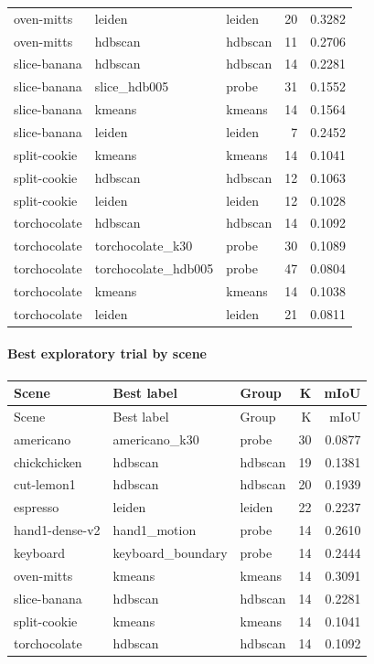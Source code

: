 \documentclass[10pt]{article}
\begin{document}
\begin{longtable}{lllrr}
oven-mitts & leiden & leiden & 20 & 0.3282 \\
oven-mitts & hdbscan & hdbscan & 11 & 0.2706 \\
slice-banana & hdbscan & hdbscan & 14 & 0.2281 \\
slice-banana & slice\_hdb005 & probe & 31 & 0.1552 \\
slice-banana & kmeans & kmeans & 14 & 0.1564 \\
slice-banana & leiden & leiden & 7 & 0.2452 \\
split-cookie & kmeans & kmeans & 14 & 0.1041 \\
split-cookie & hdbscan & hdbscan & 12 & 0.1063 \\
split-cookie & leiden & leiden & 12 & 0.1028 \\
torchocolate & hdbscan & hdbscan & 14 & 0.1092 \\
torchocolate & torchocolate\_k30 & probe & 30 & 0.1089 \\
torchocolate & torchocolate\_hdb005 & probe & 47 & 0.0804 \\
torchocolate & kmeans & kmeans & 14 & 0.1038 \\
torchocolate & leiden & leiden & 21 & 0.0811 \\
\bottomrule
\end{longtable}
\normalsize

\paragraph{Best exploratory trial by scene}
\small
\begin{longtable}{lllrr}
\toprule
Scene & Best label & Group & K & mIoU \\
\midrule
\endfirsthead
\toprule
Scene & Best label & Group & K & mIoU \\
\midrule
\endhead
americano & americano\_k30 & probe & 30 & 0.0877 \\
chickchicken & hdbscan & hdbscan & 19 & 0.1381 \\
cut-lemon1 & hdbscan & hdbscan & 20 & 0.1939 \\
espresso & leiden & leiden & 22 & 0.2237 \\
hand1-dense-v2 & hand1\_motion & probe & 14 & 0.2610 \\
keyboard & keyboard\_boundary & probe & 14 & 0.2444 \\
oven-mitts & kmeans & kmeans & 14 & 0.3091 \\
slice-banana & hdbscan & hdbscan & 14 & 0.2281 \\
split-cookie & kmeans & kmeans & 14 & 0.1041 \\
torchocolate & hdbscan & hdbscan & 14 & 0.1092 \\
\bottomrule
\end{longtable}
\normalsize
\end{document}
